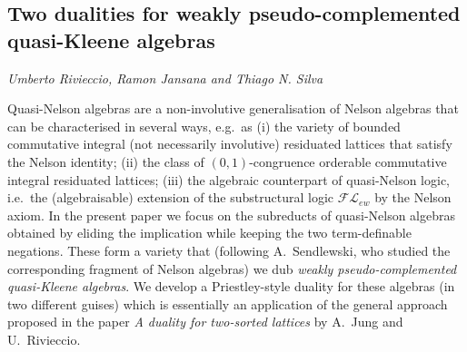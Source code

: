 \documentclass[../booklet.tex]{subfiles}
\begin{document}
\subsection[Two dualities for weakly pseudo-complemented quasi-Kleene algebras. {\it Umberto Rivieccio, Ramon Jansana and Thiago N. Silva}]{Two dualities for weakly pseudo-complemented quasi-Kleene algebras}
  

\begin{center}
  {\it Umberto Rivieccio, Ramon Jansana and Thiago N. Silva}
\end{center}



Quasi-Nelson algebras are a non-involutive generalisation of Nelson algebras that
can be %
characterised in several %
ways,
e.g.~as (i) the variety of bounded commutative integral (not necessarily involutive)  residuated lattices that satisfy the Nelson identity; %
(ii) the class of $(0,1)$-congruence orderable commutative integral  residuated lattices; %
(iii) the algebraic counterpart of quasi-Nelson logic, i.e.~the 
(algebraisable) extension of the substructural logic
$\mathcal{FL}_{ew}$ %
by the Nelson axiom. 
In the present paper  we focus on the subreducts of quasi-Nelson algebras
obtained by eliding the implication while keeping the two term-definable negations.
These form a variety %
that 
(following A.~Sendlewski, who studied the corresponding fragment of Nelson algebras)
we dub \emph{weakly pseudo-complemented quasi-Kleene algebras}.
We develop a Priestley-style duality  for these algebras (in two different guises)
which is essentially an application of the %
general approach %
proposed in the paper \emph{A duality for two-sorted lattices}
by A.~Jung and U.~Rivieccio.


\end{document}
